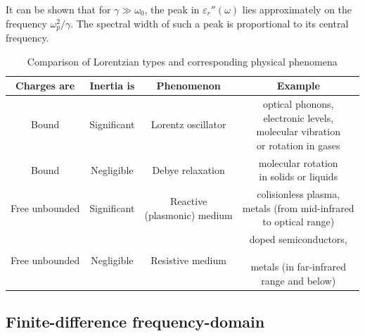 It can be shown that for $\gamma \gg \omega_0$, the peak in $\varepsilon_r''(\omega)$ lies approximately on the frequency $\omega_p^{2}/\gamma$. The spectral width of such a peak is proportional to its central frequency. 

\begin{table}[ht]   \caption{Comparison of Lorentzian types and corresponding physical phenomena}  \label{tb_lorentzians} \centering 
\begin{tabular}{cc|cc}
 \toprule
\textbf{Charges are}	& \textbf{Inertia is}				& \textbf{Phenomenon}				& \textbf{Example}		 \\
 \hline
Bound		& Significant				& Lorentz oscillator					& \shortstack{optical phonons, \\electronic levels,\\ molecular vibration \\or rotation in gases}	\\
 \hline
Bound		& Negligible				& Debye relaxation						& \shortstack{molecular rotation \\in solids or liquids} \\
 \hline
Free unbounded	& Significant				& \shortstack{Reactive\\(plasmonic) medium}			& \shortstack{colisionless plasma, \\metals (from mid-infrared\\to optical range)} \\
 \hline
Free unbounded	& Negligible				& Resistive medium						& \shortstack{doped semiconductors,\\\newline metals (in far-infrared\\ range and below)} \\
 \bottomrule
 \end{tabular} \end{table}

\subsection{Finite-difference frequency-domain} %
